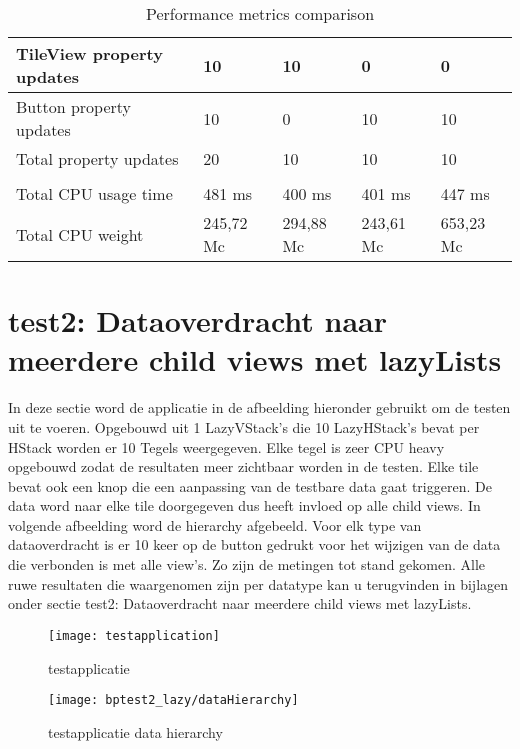 \begin{table}[H]
\begin{tabularx}{\textwidth}{|>{\raggedright\arraybackslash}m{5cm}|X|X|X|X|}
        \hline
        TileView property updates & 10 & 10 & 0 & 0 \\
        \hline
        Button property updates & 10 & 0 & 10 & 10 \\
        \hline
        Total property updates & 20 & 10 & 10 & 10 \\
        \hline
        \multicolumn{5}{|l|}{\textbf{CPU usage}} \\
        \hline
        Total CPU usage time & 481 ms & 400 ms & 401 ms & 447 ms \\
        \hline
        Total CPU weight & 245,72 Mc & 294,88 Mc & 243,61 Mc & 653,23 Mc \\
        \hline
    \end{tabularx}
    \caption{Performance metrics comparison}
    \label{tab:performance_metrics}
\end{table}


\section{test2: Dataoverdracht naar meerdere child views met lazyLists}
In deze sectie word de applicatie in de afbeelding hieronder gebruikt om de testen uit te voeren. Opgebouwd uit 1 LazyVStack's die 10 LazyHStack's bevat per HStack worden er 10 Tegels weergegeven. Elke tegel is zeer CPU heavy opgebouwd zodat de resultaten meer zichtbaar worden in de testen. Elke tile bevat ook een knop die een aanpassing van de testbare data gaat triggeren. De data word naar elke tile doorgegeven dus heeft invloed op alle child views. In volgende afbeelding word de hierarchy afgebeeld. Voor elk type van dataoverdracht is er 10 keer op de button gedrukt voor het wijzigen van de data die verbonden is met alle view's. Zo zijn de metingen tot stand gekomen. Alle ruwe resultaten die waargenomen zijn per datatype kan u terugvinden in bijlagen onder sectie test2: Dataoverdracht naar meerdere child views met lazyLists.
\begin{figure}[H]
    \centering
    \texttt{[image: testapplication]} 
    \caption{testapplicatie}
    \label{fig:testapplication2}
\end{figure}
\begin{figure}[H]
    \centering
    \texttt{[image: bptest2\_lazy/dataHierarchy]} 
    \caption{testapplicatie data hierarchy}
    \label{fig:testapplicationHierarchy2}
\end{figure}

